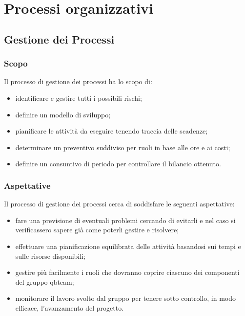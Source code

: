 \section{Processi organizzativi}
\subsection{Gestione dei Processi}
\subsubsection{Scopo}
Il processo di gestione dei processi ha lo scopo di:
\begin{itemize}
	\item identificare e gestire tutti i possibili rischi;
	\item definire un modello di sviluppo;
	\item pianificare le attività da eseguire tenendo traccia delle scadenze;
	\item determinare un preventivo suddiviso per ruoli in base alle ore e ai costi;
	\item definire un consuntivo di periodo per controllare il bilancio ottenuto.
\end{itemize}

\subsubsection{Aspettative}
Il processo di gestione dei processi cerca di soddisfare le seguenti aspettative:
\begin{itemize}
	\item fare una previsione di eventuali problemi cercando di evitarli e nel caso si verificassero sapere già come poterli gestire e risolvere;
	\item effettuare una pianificazione equilibrata delle attività basandosi sui tempi e sulle risorse disponibili;
	\item gestire più facilmente i ruoli che dovranno coprire ciascuno dei componenti del gruppo qbteam;
	\item monitorare il lavoro svolto dal gruppo per tenere sotto controllo, in modo efficace, l'avanzamento del progetto.
\end{itemize}

